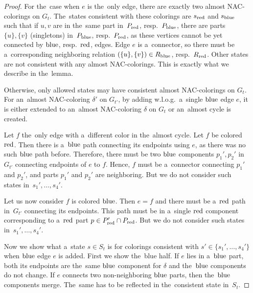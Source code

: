 \begin{proof}
	For the~case when \( e \) is the~only edge,
	there are exactly two almost NAC-colorings on \( G_t \).
	The~states consistent with these colorings are \( s_{\text{red}} \) and \( s_{\text{blue}} \)
	such that if \( u, v \) are in the~same part in~\( P_{\text{red}} \), resp.\ \( P_{\text{blue}} \),
	there are parts \( \{u\}, \{v\} \) (singletons) in~\( P_{\text{blue}} \), resp.\ \( P_{\text{red}} \),
	as these vertices cannot be yet connected by \( \text{blue} \), resp.\ \( \text{red} \), edges.
	Edge \( e \) is a~connector, so there must be a~corresponding neighboring
	relation \( (\{u\}, \{v\}) \in R_{\text{blue}} \), resp.\ \( R_{\text{red}} \).
	Other states are not consistent with any almost NAC-colorings.
	This is exactly what we describe in the~lemma.

	Otherwise, only allowed states may have consistent almost NAC-colorings on \( G_t \).
	For an~almost NAC-coloring \( \delta' \) on \( G_{t'} \),
	by adding w.l.o.g.\ a~single \( \text{blue} \) edge \( e \),
	it is either extended to an~almost NAC-coloring \( \delta \) on \( G_t \)
	or an~almost cycle is created.

	Let \( f \) the~only edge with a~different color in the~almost cycle.
	Let \( f \) be colored \( \text{red} \).
	Then there is a~\( \text{blue} \) path connecting its endpoints using \( e \),
	as there was no such \( \text{blue} \) path before.
	Therefore, there must be two \( \text{blue} \) components \( p_1', p_2' \) in~\( G_{t'} \)
	connecting endpoints of \( e \) to \( f \).
	Hence, \( f \) must be a~connector connecting \( p_1' \) and \( p_2' \),
	and parts \( p_1' \) and \( p_2' \) are neighboring.
	But we do not consider such states in~\( s_1', \dots, s_4' \).

	Let us now consider \( f \) is colored \( \text{blue} \).
	Then \( e = f \) and
	there must be a~\( \text{red} \) path in~\( G_{t'} \) connecting its endpoints.
	This path must be in a~single \( \text{red} \) component corresponding
	to a~\( \text{red} \) part \( p \in P_{\text{red}}' \cap P_{\text{red}} \).
	But we do not consider such states in~\( s_1', \dots, s_4' \).

	Now we show what a~state \( s \in S_t \) is
	for colorings consistent with \( s' \in \{s_1', \dots, s_4'\} \)
	when \( \text{blue} \) edge \( e \) is added.
	First we show the~blue half.
	If \( e \) lies in a~\( \text{blue} \) part,
	both its endpoints are the~same \( \text{blue} \) component
	for \( \delta \) and the~\( \text{blue} \) components do not change.
	If \( e \) connects two non-neighboring \( \text{blue} \) parts,
	then the~\( \text{blue} \) components merge. The~same has to be reflected in
	the~consistent state in~\( S_t \).


\end{proof}
